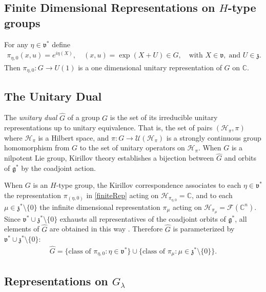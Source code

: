 \documentclass[11pt]{amsart}
\theoremstyle{plain}
\theoremstyle{definition}
\theoremstyle{remark}
\numberwithin{equation}{section}
\def\fz{\mathfrak{z}}
\def\fg{\mathfrak{g}}
\def\fv{\mathfrak{v}}
\def\cU{\mathcal{U}}
\def\cH{\mathcal{H}}
\def\cF{\mathcal{F}}
\def\mz{\setminus\{0\}}
\def\C{{\mathbb C}}%
\numberwithin{equation}{section}
\begin{document}
\subsection{Finite Dimensional Representations on $H$-type groups}
For any $\eta\in \fv^*$ define 
\begin{align}\label{finiteRep}
	\pi_{\eta, 0}(x, u)=e^{i\eta(X) }, \quad (x, u)=\exp(X+U)\in G, \quad \text{with } X\in \fv, \; \text{and }U\in \fz.
\end{align}
Then $\pi_{\eta, 0}: G\to U(1)$ is a one dimensional unitary representation of $G$ on $\C$. 


\subsection{The Unitary Dual}
The \textit{unitary dual} $\widehat{G}$ of a group $G$ is the set  of its irreducible unitary representations up to unitary equivalence. That is, the set of pairs $(\cH_\pi, \pi)$ where $\cH_\pi$ is a Hilbert space, and $\pi: G\to \cU(\cH_\pi)$ is a strongly continuous group homomorphism from $G$ to the set of unitary operators on $\cH_\pi$. When $G$ is a nilpotent Lie group,  Kirillov theory establishes a bijection between $\widehat{G}$ and orbits of $\fg^*$ by the coadjoint action. 

When $G$ is an $H$-type group, the Kirillov correspondence associates to each $\eta\in \fv^*$  the representation $\pi_{(\eta,  0)}$ in \eqref{finiteRep} acting on $\cH_{\pi_{\eta, 0}}=\mathbb{C}$, and to each $\mu\in \fz^*\mz$ the infinite dimensional representation $\pi_{\mu}$  acting on $\cH_{\pi_\mu}=\cF(\C^n)$. Since $\fv^*\cup \fz^*\mz$ exhausts all representatives of the coadjoint orbits of $\fg^*$, all elements of $\widehat{G}$ are obtained in this way \cite{kirillovUnitaryRepresentationsNilpotent1962}. Therefore $\widehat{G}$ is parameterized by $\fv^*\cup \fz^*\setminus\{0\}$:  
\begin{align*}
	\widehat{G}=\{\text{class of } \pi_{\eta, 0}: \eta\in \fv^*\}\cup \{\text{class of } \pi_\mu: \mu \in \fz^*\setminus\{0\}\}.
\end{align*}
\subsection{Representations on $G_\lambda$}
\end{document}

